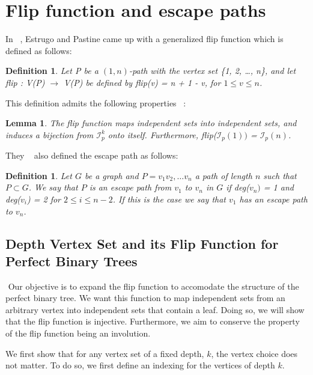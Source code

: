 \documentclass{amsart}
\newtheorem{lemma}[theorem]{Lemma}
\newtheorem{definition}[theorem]{Definition}
\theoremstyle{definition}
\begin{document}
\section{Flip function and escape paths}

In ~\cite{MR4245360}, Estrugo and Pastine came up with a generalized flip function which is defined as follows:

\begin{definition}
    Let P be a $(1,n)$-path with the vertex set \{1, 2, \ldots, n\}, and let flip : V(P) $\rightarrow$ V(P) be defined by flip(v) = n + 1 - v, for $1\leq v \leq n$.
\end{definition}

This definition admits the following properties ~\cite{MR4245360}:
\begin{lemma}
    The flip function maps independent sets into independent sets, and induces a bijection from $\mathcal{I}^k_p$ onto itself. Furthermore, flip($\mathcal{I}_p(1))$ = $\mathcal{I}_p(n)$.
\end{lemma}

They ~\cite{MR4245360} also defined the escape path as follows:

\begin{definition}
    Let $G$ be a graph and $P = v_1v_2, \ldots v_n$ a path of length $n$ such that $P \subset G$. We say that $P$ is an escape path from $v_1$ to $v_n$ in $G$ if deg($v_n)$ = 1 and deg($v_i$) = 2 for $2 \leq i \leq n-2$. If this is the case we say that $v_1$ has an escape path to $v_n$.
\end{definition}


\subsection{Depth Vertex Set and its Flip Function for Perfect Binary Trees}\label{Flip For Perfect Binary Trees}
$ $
Our objective is to expand the flip function to accomodate the structure of the perfect binary tree. We want this function to map independent sets from an arbitrary vertex into independent sets that contain a leaf. Doing so, we will show that the flip function is injective. Furthermore, we aim to conserve the property of the flip function being an involution.

We first show that for any vertex set of a fixed depth, $k$, the vertex choice does not matter. To do so, we first define an indexing for the vertices of depth $k$. 
\end{document}
